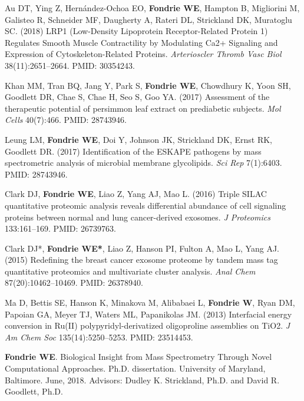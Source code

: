 \documentclass[11pt]{article}
\newcommand{\mysection}[1]{\vspace{1ex \textbf{\large \textrm{#1}} \quad
    \hrulefill}}
\begin{document}
\begin{etaremune}
  \item Au DT, Ying Z, Hernández-Ochoa EO, \textbf{Fondrie WE}, Hampton B,
  Migliorini M, Galisteo R, Schneider MF, Daugherty A, Rateri DL, Strickland
  DK, Muratoglu SC. (2018) LRP1 (Low-Density Lipoprotein Receptor-Related
  Protein 1) Regulates Smooth Muscle Contractility by Modulating Ca2+ Signaling
  and Expression of Cytoskeleton-Related Proteins. \textit{Arterioscler Thromb
    Vasc Biol} 38(11):2651--2664. PMID: 30354243.
    
  \item Khan MM, Tran BQ, Jang Y, Park S, \textbf{Fondrie WE}, Chowdhury K,
  Yoon SH, Goodlett DR, Chae S, Chae H, Seo S, Goo YA. (2017) Assessment of the
  therapeutic potential of persimmon leaf extract on prediabetic subjects. {\it
    Mol Cells} 40(7):466. PMID: 28743946.
    
  \item Leung LM, \textbf{Fondrie WE}, Doi Y, Johnson JK, Strickland DK, Ernst
  RK, Goodlett DR. (2017) Identification of the ESKAPE pathogens by mass
  spectrometric analysis of microbial membrane glycolipids. {\it Sci Rep}
  7(1):6403. PMID: 28743946.

  \item Clark DJ, \textbf{Fondrie WE}, Liao Z, Yang AJ, Mao L. (2016) Triple
  SILAC quantitative proteomic analysis reveals differential abundance of cell
  signaling proteins between normal and lung cancer-derived exosomes. {\it J
    Proteomics} 133:161--169. PMID: 26739763.

  \item Clark DJ*, \textbf{Fondrie WE*}, Liao Z, Hanson PI, Fulton A, Mao L,
  Yang AJ. (2015) Redefining the breast cancer exosome proteome by tandem mass
  tag quantitative proteomics and multivariate cluster analysis. \textit{Anal
    Chem} 87(20):10462--10469. PMID: 26378940.
    
  \item Ma D, Bettis SE, Hanson K, Minakova M, Alibabaei L, \textbf{Fondrie W},
  Ryan DM, Papoian GA, Meyer TJ, Waters ML, Papanikolas JM. (2013) Interfacial
  energy conversion in Ru(II) polypyridyl-derivatized oligoproline assemblies
  on TiO2. \textit{J Am Chem Soc} 135(14):5250--5253. PMID: 23514453.
\end{etaremune}

\mysection{Additional Publications}
\begin{etaremune}
  \item \textbf{Fondrie WE}. Biological Insight from Mass Spectrometry Through
  Novel Computational Approaches. Ph.D. dissertation. University of Maryland,
  Baltimore. June, 2018. Advisors: Dudley K. Strickland, Ph.D. and David R.
  Goodlett, Ph.D.
\end{etaremune}
\end{document}
